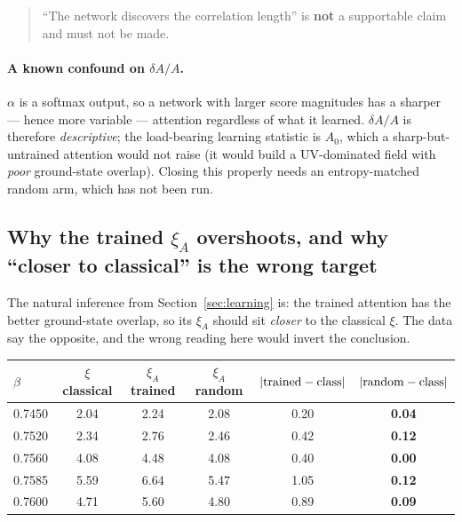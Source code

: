 \documentclass[11pt,a4paper]{article}
\newcommand{\xiA}{\xi_A}
\begin{document}
\begin{quote}
``The network discovers the correlation length'' is \textbf{not} a supportable
claim and must not be made.
\end{quote}

\paragraph{A known confound on $\delta A/A$.} $\alpha$ is a softmax output, so a
network with larger score magnitudes has a sharper --- hence more variable ---
attention regardless of what it learned. $\delta A/A$ is therefore
\emph{descriptive}; the load-bearing learning statistic is $A_0$, which a
sharp-but-untrained attention would not raise (it would build a UV-dominated
field with \emph{poor} ground-state overlap). Closing this properly needs an
entropy-matched random arm, which has not been run.

\subsection{Why the trained $\xiA$ overshoots, and why ``closer to classical'' is the wrong target}
\label{sec:overshoot}

The natural inference from Section~\ref{sec:learning} is: the trained attention
has the better ground-state overlap, so its $\xiA$ should sit \emph{closer} to
the classical $\xi$. The data say the opposite, and the wrong reading here would
invert the conclusion.

\begin{center}
\begin{tabular}{@{}lccccc@{}}
\toprule
$\beta$ & $\xi$ classical & $\xiA$ trained & $\xiA$ random
        & $|{\rm trained}-{\rm class}|$ & $|{\rm random}-{\rm class}|$ \\
\midrule
0.7450 & 2.04 & 2.24 & 2.08 & 0.20 & \textbf{0.04} \\
0.7520 & 2.34 & 2.76 & 2.46 & 0.42 & \textbf{0.12} \\
0.7560 & 4.08 & 4.48 & 4.08 & 0.40 & \textbf{0.00} \\
0.7585 & 5.59 & 6.64 & 5.47 & 1.05 & \textbf{0.12} \\
0.7600 & 4.71 & 5.60 & 4.80 & 0.89 & \textbf{0.09} \\
\bottomrule
\end{tabular}
\end{center}
\end{document}
